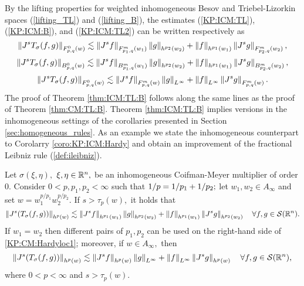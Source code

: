 By the lifting properties for weighted inhomogeneous Besov and Triebel-Lizorkin spaces (\ref{lifting_TL}) and (\ref{lifting_B}), the estimates (\ref{KP:ICM:TL}), (\ref{KP:ICM:B}), and (\ref{KP:ICM:TL2}) can be written respectively as 
\begin{equation}\label{lifted:KP:ICM:TL}
\norm{J^s T_\sigma(f,g)}{\itlw{p}{0}{q}{w}} \lesssim \norm{J^s f}{\itlw{p_1}{m}{q}{w_1}} \norm{g}{h^{p_2}(w_2)} +  \norm{f}{h^{p_1}(w_1)}   \norm{J^s g}{\itlw{p_2}{m}{q}{w_2}},
\end{equation}
\begin{equation}\label{lifted:KP:ICM:B}
\norm{J^s T_\sigma(f,g)}{\ibesw{p}{0}{q}{w}} \lesssim \norm{J^s f}{\ibesw{p_1}{m}{q}{w_1} } \norm{g}{h^{p_2}(w_2)} +  \norm{f}{h^{p_1}(w_1)}   \norm{J^s g}{\ibesw{p_2}{m}{q}{w_2} },
\end{equation}
\begin{equation}\label{lifted:KP:ICM:TL2}
\norm{J^s T_\sigma(f,g)}{\itlw{p}{0}{q}{w}} \lesssim \norm{J^s f}{\itlw{p}{m}{q}{w} } \norm{g}{L^\infty} +  \norm{f}{L^\infty}   \norm{J^s g}{\itlw{p}{m}{q}{w}}.
\end{equation}
The proof of Theorem \ref{thm:ICM:TL:B} follows along the same lines as the proof of Theorem \ref{thm:CM:TL:B}. Theorem \ref{thm:ICM:TL:B} implies versions in the inhomogeneous settings of the corollaries presented in Section \ref{sec:homogeneous_rules}. As an example we state the inhomogeneous counterpart to Corolarry \ref{coro:KP:ICM:Hardy} and obtain an improvement of the fractional Leibniz rule (\ref{def:ileibniz}).

\begin{corollary}\label{coro:KP:CM:Hardyloc}  Let $\sigma(\xi,\eta),$ $\xi,\eta\in\rn,$ be an inhomogeneous Coifman-Meyer multiplier of order $0.$ 
Consider  $0 < p, p_1, p_2  < \infty$  such that $\hcline;$ let  $w_1,w_2\in A_\infty$ and set $w=w_1^{{p}/{p_1}} w_2^{{p}/{p_2}}.$ 
If  $s > \tau_p(w),$ it holds that
\begin{equation}\label{KP:CM:Hardyloc1}
\norm{J^s(T_\sigma(f,g))}{h^p(w)} \lesssim \norm{J^s f}{h^{p_1}(w_1)} \norm{g}{h^{p_2}(w_2)} +  \norm{f}{h^{p_1}(w_1)}   \norm{J^s g}{h^{p_2}(w_2)} \quad \forall f, g \in \sw.
\end{equation}
If $w_1=w_2$ then different pairs of $p_1, p_2$ can be used on the right-hand side of \eqref{KP:CM:Hardyloc1}; moreover, if $w\in A_\infty,$ then 
\begin{equation}\label{KP:CM:Hardyloc2}
\norm{J^s(T_\sigma(f,g))}{h^p(w)} \lesssim \norm{J^s f}{h^{p}(w)} \norm{g}{L^\infty} +  \norm{f}{L^\infty}   \norm{J^s g}{h^{p}(w)} \quad \forall f, g \in \sw,
\end{equation}
where $0<p<\infty$ and $s>\tau_{p}(w).$
\end{corollary}

